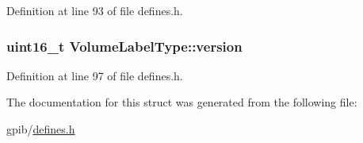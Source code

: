 Definition at line 93 of file defines.\+h.

\subsubsection[{\texorpdfstring{version}{version}}]{\setlength{\rightskip}{0pt plus 5cm}uint16\+\_\+t Volume\+Label\+Type\+::version}\hypertarget{structVolumeLabelType_a59f56fd1f28549bc625aeaaa57c8d0d2}{}\label{structVolumeLabelType_a59f56fd1f28549bc625aeaaa57c8d0d2}


Definition at line 97 of file defines.\+h.



The documentation for this struct was generated from the following file\+:\begin{DoxyCompactItemize}
\item 
gpib/\hyperlink{defines_8h}{defines.\+h}\end{DoxyCompactItemize}
